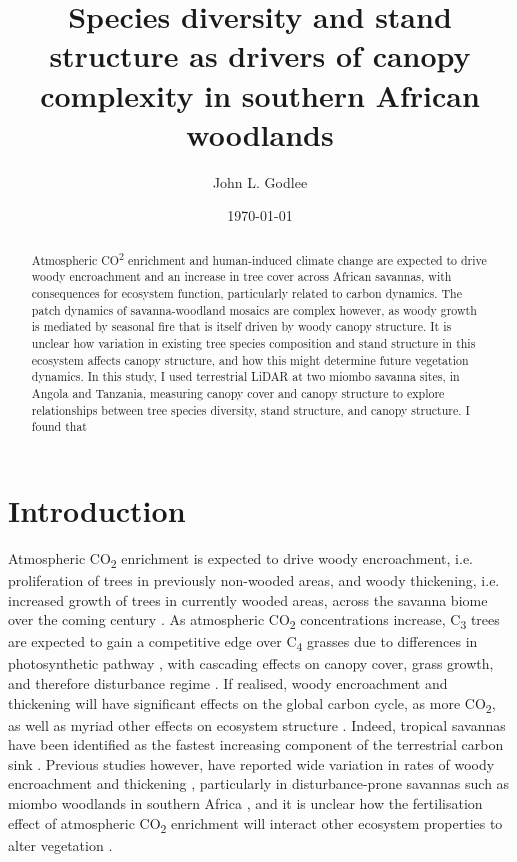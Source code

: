 \documentclass[11pt,a4paper]{article}
\title{Species diversity and stand structure as drivers of canopy complexity in southern African woodlands}
\author{John L. Godlee}
\date{\today}
\begin{document}
\maketitle{}

\linenumbers

\begin{abstract}
Atmospheric CO\textsuperscript{2} enrichment and human-induced climate change are expected to drive woody encroachment and an increase in tree cover across African savannas, with consequences for ecosystem function, particularly related to carbon dynamics. The patch dynamics of savanna-woodland mosaics are complex however, as woody growth is mediated by seasonal fire that is itself driven by woody canopy structure. It is unclear how variation in existing tree species composition and stand structure in this ecosystem affects canopy structure, and how this might determine future vegetation dynamics. In this study, I used terrestrial LiDAR at two miombo savanna sites, in Angola and Tanzania, measuring canopy cover and canopy structure to explore relationships between tree species diversity, stand structure, and canopy structure. I found that 
\end{abstract}

\section{Introduction}

Atmospheric CO\textsubscript{2} enrichment is expected to drive woody encroachment, i.e. proliferation of trees in previously non-wooded areas, and woody thickening, i.e. increased growth of trees in currently wooded areas, across the savanna biome over the coming century \citep{Criado2020, Stevens2016, Mitchard2013}. As atmospheric CO\textsubscript{2} concentrations increase, C\textsubscript{3} trees are expected to gain a competitive edge over C\textsubscript{4} grasses due to differences in photosynthetic pathway \citep{Buitenwerf2012}, with cascading effects on canopy cover, grass growth, and therefore disturbance regime \citep{Bond2012}. If realised, woody encroachment and thickening will have significant effects on the global carbon cycle, as more CO\textsubscript{2}, as well as myriad other effects on ecosystem structure \citep{Donohue2013}. Indeed, tropical savannas have been identified as the fastest increasing component of the terrestrial carbon sink \citep{Sitch2015}. Previous studies however, have reported wide variation in rates of woody encroachment and thickening \citep{Mitchard2013}, particularly in disturbance-prone savannas such as miombo woodlands in southern Africa \citep{Lewis2009}, and it is unclear how the fertilisation effect of atmospheric CO\textsubscript{2} enrichment will interact other ecosystem properties to alter vegetation \citep{Korner2017, Reich2014}.
\end{document}
